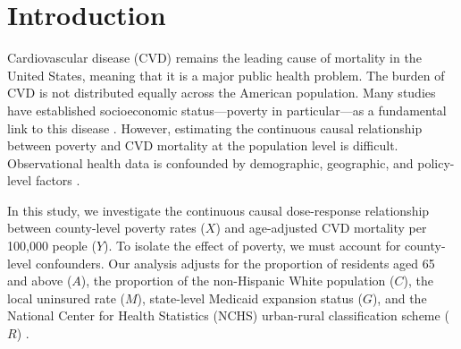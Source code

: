 \documentclass{article}
\theoremstyle{plain}
\theoremstyle{definition}
\theoremstyle{remark}
\begin{document}
\begin{abstract}
We study the causal effect of county-level poverty rates on cardiovascular 
disease (CVD) mortality in the United States using continuous-treatment causal 
inference methods. Estimating this relationship is complicated by confounding, 
potential nonlinearity, and censored outcomes resulting from CDC  
suppression rules. We address these challenges by combining doubly robust 
continuous treatment effect estimation with a left-censored multiple 
imputation strategy for suppression mechanisms. Using 2016 
county-level data, we estimate the causal dose-response function and explore 
heterogeneous effects with causal forests. We find a linear causal effect of poverty. Furthermore, our heterogeneity 
analysis reveals that the marginal impact of poverty is steeper 
in states with Medicaid expansion, suggesting complex interactions between healthcare access and socioeconomic disparities.
\end{abstract}

\section{Introduction}
\label{sec:intro}

Cardiovascular disease (CVD) remains the leading cause of mortality in the United 
States, meaning that it is a major public health problem\citep{tsao2023heart}. 
The burden of CVD is not 
distributed equally across the American population. Many studies have established socioeconomic status—poverty in particular—as a 
fundamental link to this disease \citep{link1995social, marmot2005social}. However, 
estimating the continuous causal relationship between poverty and CVD 
mortality at the population level is difficult. Observational health 
data is confounded by demographic, geographic, and policy-level 
factors \citep{galea2011estimated}.

In this study, we investigate the continuous causal dose-response 
relationship between county-level poverty rates ($X$) and age-adjusted CVD 
mortality per 100,000 people ($Y$). To isolate the effect of poverty, we 
must account for county-level confounders. Our analysis adjusts 
for the proportion of residents aged 65 and above ($A$), the proportion of the 
non-Hispanic White population ($C$), the local uninsured rate ($M$), state-level 
Medicaid expansion status ($G$), and the National Center for Health Statistics 
(NCHS) urban-rural classification scheme ($R$) \citep{ingram20142013}.
\end{document}
